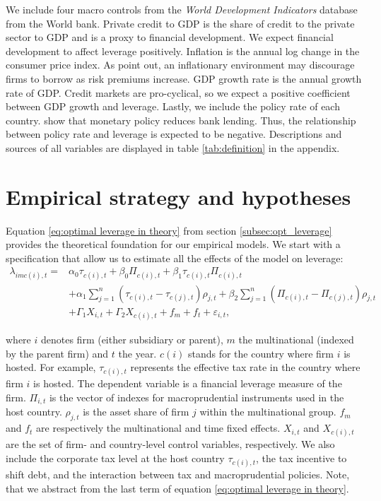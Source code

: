 \documentclass[12pt]{article}
\begin{document}
	 We include four macro controls from the \textit{World Development Indicators} database from the World bank. Private credit to GDP is the share of credit to the private sector to GDP and is a proxy to financial development. We expect financial development to affect leverage positively. Inflation is the annual log change in the consumer price index. As \cite{huizinga2008capital} point out, an inflationary environment may discourage firms to borrow as risk premiums increase. GDP growth rate is the annual growth rate of GDP. Credit markets are pro-cyclical, so we expect a positive coefficient between GDP growth and leverage. Lastly, we include the policy rate of each country. \cite*{jimenez2012credit} show that monetary policy reduces bank lending. Thus, the relationship between policy rate and leverage is expected to be negative. Descriptions and sources of all variables are displayed in table \ref{tab:definition} in the appendix.
			
	\section{Empirical strategy and hypotheses}
	\label{sec:strategy}
	Equation \ref{eq:optimal leverage in theory} from section \ref{subsec:opt_leverage} provides the theoretical foundation for our empirical models. We start with a specification that allow us to estimate all the effects of the model on leverage: 
	\begin{equation}
	\begin{aligned}
	\lambda_{imc(i),t}=&\alpha_0\tau_{c(i),t}+\beta_0\Pi_{c(i),t}+\beta_1\tau_{c(i),t}\Pi_{c(i),t}\\
	&+\alpha_1\sum_{j=1}^{n}(\tau_{c(i),t}-\tau_{c(j),t})\rho_{j,t}+\beta_2\sum_{j=1}^{n}(\Pi_{c(i),t}-\Pi_{c(j),t})\rho_{j,t}\\
	&+\Gamma_1 X_{i,t}+\Gamma_2 X_{c(i),t}+f_{m}+f_{t}+\varepsilon_{i,t},
	\label{eq:optimal leverage empirically 1}
	\end{aligned}
	\end{equation}
	
	where $i$ denotes firm (either subsidiary or parent), $m$ the multinational (indexed by the parent firm) and $t$ the year. $c(i)$ stands for the country where firm $i$ is hosted. For example, $\tau_{c(i),t}$ represents the effective tax rate in the country where firm $i$ is hosted. The dependent variable is a financial leverage measure of the firm. $\Pi_{i,t}$ is the vector of indexes for macroprudential instruments used in the host country. $\rho_{j,t}$ is the asset share of firm $j$ within the multinational group. $f_{m}$ and $f_{t}$ are respectively the multinational and time fixed effects. $X_{i,t}$ and $X_{c(i),t}$ are the set of firm- and country-level control variables, respectively. We also include the corporate tax level at the host country $\tau_{c(i),t}$, the tax incentive to shift debt, and the interaction between tax and macroprudential policies. Note, that we abstract from the last term of equation \ref{eq:optimal leverage in theory}. 
	
\end{document}
